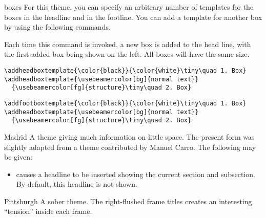 \begin{themeexample}[{\opt{|[headheight=|\meta{head height}|,footheight=|\meta{foot height}|]|}}]{boxes}
  For this theme, you can specify an arbitrary number of templates for
  the boxes in the headline and in the footline. You can add a
  template for another box by using the following commands.
\end{themeexample}

\begin{command}{\addheadboxtemplate%
    }
  Each time this command is invoked, a new box is added to the head
  line, with the first added box being shown on the left. All boxes
  will have the same size.
  \example
\begin{verbatim}
\addheadboxtemplate{\color{black}}{\color{white}\tiny\quad 1. Box}
\addheadboxtemplate{\usebeamercolor[bg]{normal text}}
  {\usebeamercolor[fg]{structure}\tiny\quad 2. Box}
\end{verbatim}
\end{command}

\begin{command}{\addfootboxtemplate%
    }
  \example
\begin{verbatim}
\addfootboxtemplate{\color{black}}{\color{white}\tiny\quad 1. Box}
\addheadboxtemplate{\usebeamercolor[bg]{normal text}}
  {\usebeamercolor[fg]{structure}\tiny\quad 2. Box}
\end{verbatim}
\end{command}


\begin{themeexample}{Madrid}
  A theme giving much information on little space. The present form
  was slightly adapted from a theme contributed by Manuel Carro.
  The following  may be given:
  \begin{itemize}
  \item {} causes a headline to be inserted showing
    the current section and subsection. By default, this
    headline is not shown.
  \end{itemize}
\end{themeexample}


\begin{themeexample}{Pittsburgh}
  A sober theme. The right-flushed frame titles creates an interesting 
  ``tension'' inside each frame. 
\end{themeexample}


